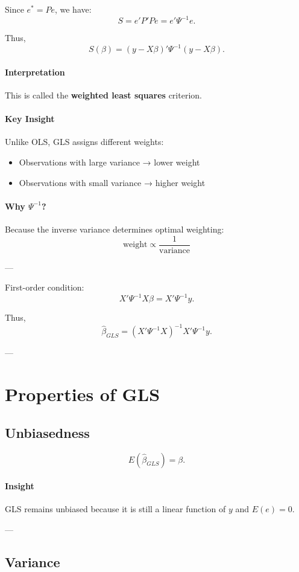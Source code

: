 Since $e^* = Pe$, we have:
\[
S = e'P'Pe = e'\Psi^{-1}e.
\]

Thus,
\[
S(\beta)
=
(y-X\beta)'\Psi^{-1}(y-X\beta).
\]

\paragraph{Interpretation}
This is called the \textbf{weighted least squares} criterion.

\paragraph{Key Insight}
Unlike OLS, GLS assigns different weights:
\begin{itemize}
    \item Observations with large variance → lower weight
    \item Observations with small variance → higher weight
\end{itemize}

\paragraph{Why $\Psi^{-1}$?}
Because the inverse variance determines optimal weighting:
\[
\text{weight} \propto \frac{1}{\text{variance}}
\]

---

First-order condition:
\[
X'\Psi^{-1}X\beta = X'\Psi^{-1}y.
\]

Thus,
\[
\hat{\beta}_{GLS}
=
(X'\Psi^{-1}X)^{-1}X'\Psi^{-1}y.
\]

---

\section{Properties of GLS}

\subsection{Unbiasedness}

\[
E(\hat{\beta}_{GLS})=\beta.
\]

\paragraph{Insight}
GLS remains unbiased because it is still a linear function of $y$ and $E(e)=0$.

---

\subsection{Variance}

